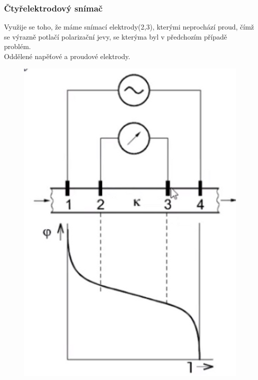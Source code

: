 \subsubsection*{Čtyřelektrodový snímač}
Využije se toho, že máme snímací elektrody(2,3), kterými neprochází proud, čímž se výrazně potlačí polarizační jevy, se kterýma byl v předchozím případě problém.\\
Oddělené napěťové a proudové elektrody.\\
\begin{figure}[h!]
    \centering
    \includegraphics[scale = 0.05]{img/CtyrElektr.png}
\end{figure}

